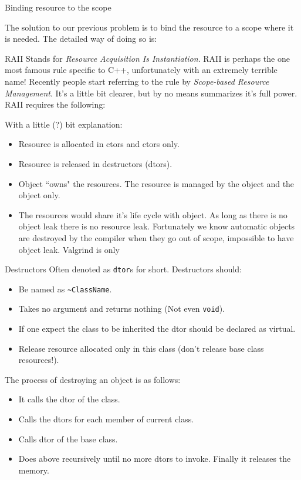 \begin{frame}{Binding resource to the scope}

The solution to our previous problem is to bind the resource to a scope where it is needed. The detailed way of doing so is:
\end{frame}



\begin{frame}{RAII}
\small
Stands for \textit{Resource Acquisition Is Instantiation}. RAII is perhaps the one most famous rule specific to C++, unfortunately with an extremely terrible name! Recently people start referring to the rule by \textit{Scope-based Resource Management}. It's a little bit clearer, but by no means summarizes it's full power. RAII requires the following:
\begin{center}
\end{center}
With a little (?) bit explanation:
\begin{itemize}
\small
\item Resource is allocated in ctors and ctors only.
\item Resource is released in destructors (dtors).
\item Object ``owns" the resources. The resource is managed by the object and the object only. 
\item The resources would share it's life cycle with object. As long as there is no object leak there is no resource leak. Fortunately we know automatic objects are destroyed by the compiler when they go out of scope, impossible to have object leak.
Valgrind is only 
\end{itemize}
\end{frame}

\begin{frame}{Destructors}
Often denoted as \texttt{dtor}s for short. Destructors should:
\begin{itemize}
\item Be named as \texttt{\textasciitilde ClassName}.
\item Takes no argument and returns nothing (Not even \texttt{void}).
\item If one expect the class to be inherited the dtor should be declared as virtual.
\item Release resource allocated only in this class (don't release base class resources!).
\end{itemize}
The process of destroying an object is as follows:
\begin{itemize}
\item It calls the dtor of the class.
\item Calls the dtors for each member of \alert{current} class.
\item Calls dtor of the base class.
\item Does above recursively until no more dtors to invoke. Finally it releases the memory.
\end{itemize}
\end{frame}

